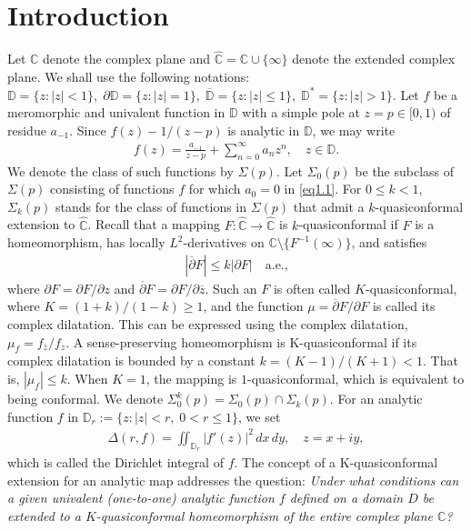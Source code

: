 \documentclass[a4paper,12pt]{amsart}
\theoremstyle{plain}
\theoremstyle{definition}
\begin{document}
\section{\bf Introduction}
Let $\mathbb{C}$ denote the complex plane and $\widehat{\mathbb{C}} = \mathbb{C}\cup\{\infty\}$ denote the extended complex plane. We shall use the following notations: $\mathbb{D} = \{z : |z| < 1\},\;
\partial\mathbb{D} = \{z : |z| = 1\},\;
\overline{\mathbb{D}} = \{z : |z| \leq 1\},\;
\mathbb{D}^* = \{z : |z| > 1\}.$ Let $f$ be a meromorphic and univalent function in $\mathbb{D}$ with a simple pole at $z = p \in [0,1)$ of residue $a_{-1}$. Since $f(z) -{1}/(z-p)$ is analytic in $\mathbb{D}$, we may write
\begin{align} \label{eq1.1}
	f(z) = \frac{a_{-1}}{z-p} + \sum_{n=0}^{\infty} a_n z^n, \quad z \in \mathbb{D}.
\end{align}
We denote the class of such functions by $\Sigma(p)$. Let $\Sigma_{0}(p)$ be the subclass of $\Sigma(p)$ consisting of functions $f$ for which $a_0 = 0$ in \eqref{eq1.1}. For $0 \leq k < 1$, $\Sigma_{k}(p)$ stands for the class of functions in $\Sigma(p)$ that admit a $k$-quasiconformal extension to $\widehat{\mathbb{C}}$. Recall that a mapping $F:\widehat{\mathbb{C}} \to \widehat{\mathbb{C}}$ is $k$-quasiconformal if $F$ is a homeomorphism, has locally $L^2$-derivatives on $\mathbb{C}\setminus\{F^{-1}(\infty)\}$, and satisfies
\begin{align*}
	|\overline{\partial}F| \leq k |\partial F| \quad \text{a.e.,}
\end{align*}
\noindent where $\partial F = \partial F / \partial z$ and $\overline{\partial}F = \partial F / \partial \overline{z}$. Such an $F$ is often called $K$-quasiconformal, where $K = {(1+k)}/{(1-k)} \geq 1$, and the function $\mu = \overline{\partial}F / \partial F$ is called its complex dilatation. This can be expressed using the complex dilatation, $\mu_f = f_{\bar{z}} / f_z$. A sense-preserving homeomorphism is K-quasiconformal if its complex dilatation is bounded by a constant $k = (K-1)/(K+1) < 1$. That is, $|\mu_f| \leq k$. When $K=1$, the mapping is $1$-quasiconformal, which is equivalent to being conformal. We denote $\Sigma_{0}^{k}(p) = \Sigma_{0}(p) \cap \Sigma_{k}(p)$.\vspace{2mm}
For an analytic function $f$ in $\mathbb{D}_r := \{ z : |z| < r,\; 0 < r \leq 1 \}$, we set
\begin{align}\label{Eq-1.2}
	\Delta(r,f) = \iint_{\mathbb{D}_r} |f'(z)|^2 \, dx \, dy, 
	\quad z = x + iy,
\end{align}
which is called the Dirichlet integral of $f$.
The concept of a K-quasiconformal extension for an analytic map addresses the question: \emph{ Under what conditions can a given univalent (one-to-one) analytic function $f$ defined on a domain $D$ be extended to a $K$-quasiconformal homeomorphism of the entire complex plane $\mathbb{C}$?}\vspace{1.2mm}
\end{document}
